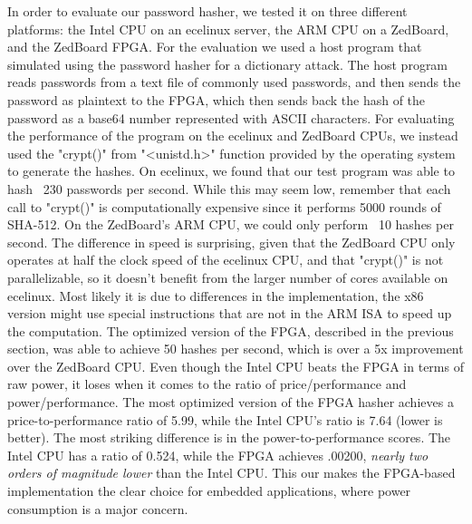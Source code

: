 In order to evaluate our password hasher, we tested it on three different platforms: the Intel CPU on an
ecelinux server, the ARM CPU on a ZedBoard, and the ZedBoard FPGA. For the evaluation we used a host program
that simulated using the password hasher for a dictionary attack. The host program reads passwords from
a text file of commonly used passwords, and then sends the password as plaintext to the FPGA, which
then sends back the hash of the password as a base64 number represented with ASCII characters. For
evaluating the performance of the program on the ecelinux and ZedBoard CPUs, we instead used the
"crypt()" from "<unistd.h>" function provided by the operating system to generate the hashes. On
ecelinux, we found that our test program was able to hash ~230 passwords per second. While this may seem
low, remember that each call to "crypt()" is computationally expensive since it performs 5000 rounds of
SHA-512. On the ZedBoard's ARM CPU, we could only perform ~10 hashes per second. The difference in speed
is surprising, given that the ZedBoard CPU only operates at half the clock speed of the ecelinux CPU, and
that "crypt()" is not parallelizable, so it doesn't benefit from the larger number of cores available on
ecelinux. Most likely it is due to differences in the implementation, the x86 version might use special
instructions that are not in the ARM ISA to speed up the computation. The optimized version of the FPGA,
described in the previous section, was able to achieve 50 hashes per second, which is over a 5x
improvement over the ZedBoard CPU. Even though the Intel CPU beats the FPGA in terms of raw
power, it loses when it comes to the ratio of price/performance and power/performance. The most optimized
version of the FPGA hasher achieves a price-to-performance ratio of 5.99, while the Intel CPU's ratio is
7.64 (lower is better). The most striking difference is in the power-to-performance scores. The Intel CPU
has a ratio of 0.524, while the FPGA achieves .00200, \emph{nearly two orders of magnitude lower} than the
Intel CPU. This our makes the FPGA-based implementation the clear choice for embedded applications, where
power consumption is a major concern.
